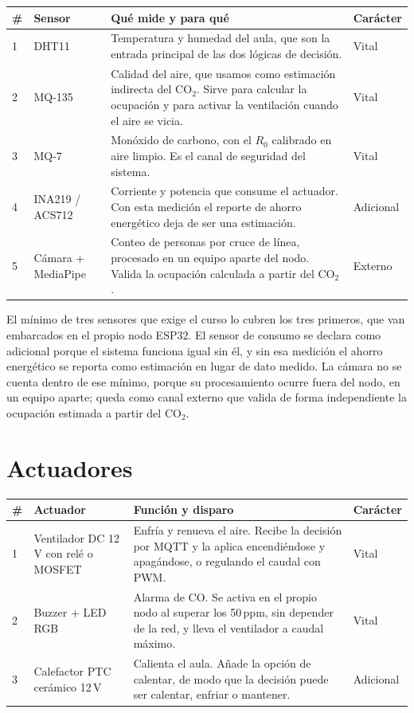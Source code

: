 \documentclass[10pt,a4paper]{article}
\begin{document}
\vspace{2pt}
{\footnotesize
\begin{tabularx}{\textwidth}{@{}C{0.7cm} l X C{1.9cm}@{}}
\toprule
\textbf{\#} & \textbf{Sensor} & \textbf{Qué mide y para qué} & \textbf{Carácter} \\
 & DHT11 & Temperatura y humedad del aula, que son la entrada principal de las dos
    lógicas de decisión. & Vital \\
2 & MQ-135 & Calidad del aire, que usamos como estimación indirecta del CO$_2$. Sirve para
    calcular la ocupación y para activar la ventilación cuando el aire se vicia. & Vital \\
3 & MQ-7 & Monóxido de carbono, con el $R_0$ calibrado en aire limpio. Es el canal de
    seguridad del sistema. & Vital \\
4 & INA219 / ACS712 & Corriente y potencia que consume el actuador. Con esta medición el
    reporte de ahorro energético deja de ser una estimación. & Adicional \\
5 & Cámara + MediaPipe & Conteo de personas por cruce de línea, procesado en un equipo
    aparte del nodo. Valida la ocupación calculada a partir del CO$_2$. & Externo \\
\bottomrule
\end{tabularx}}

\vspace{3pt}
El mínimo de tres sensores que exige el curso lo cubren los tres primeros, que van
embarcados en el propio nodo ESP32. El sensor de consumo se declara como adicional porque
el sistema funciona igual sin él, y sin esa medición el ahorro energético se reporta como
estimación en lugar de dato medido. La cámara no se cuenta dentro de ese mínimo, porque su
procesamiento ocurre fuera del nodo, en un equipo aparte; queda como canal externo que
valida de forma independiente la ocupación estimada a partir del CO$_2$.

\section{Actuadores}

\vspace{2pt}
{\footnotesize
\begin{tabularx}{\textwidth}{@{}C{0.7cm} L{3.6cm} X C{1.9cm}@{}}
\toprule
\textbf{\#} & \textbf{Actuador} & \textbf{Función y disparo} & \textbf{Carácter} \\
 & Ventilador DC 12\,V con relé o MOSFET
  & Enfría y renueva el aire. Recibe la decisión por MQTT y la aplica encendiéndose y
    apagándose, o regulando el caudal con PWM. & Vital \\
2 & Buzzer + LED RGB
  & Alarma de CO. Se activa en el propio nodo al superar los 50\,ppm, sin depender de la
    red, y lleva el ventilador a caudal máximo. & Vital \\
3 & Calefactor PTC cerámico 12\,V
  & Calienta el aula. Añade la opción de calentar, de modo que la decisión puede ser
    calentar, enfriar o mantener. & Adicional \\
\bottomrule
\end{tabularx}}
\end{document}
